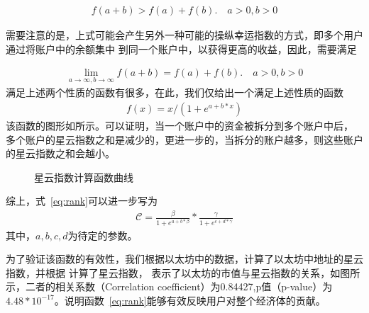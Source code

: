 \begin{align}
f(a + b) > f(a) + f(b).\quad a>0, b>0
\end{align}

需要注意的是，上式可能会产生另外一种可能的操纵幸运指数的方式，即多个用户通过将账户中的余额集中
到同一个账户中，以获得更高的收益，因此，需要满足

\begin{align}
\lim\limits_{a \to \infty, b\to \infty} f(a+b) = f(a) + f(b).\quad a>0, b>0
\end{align}
满足上述两个性质的函数有很多，在此，我们仅给出一个满足上述性质的函数
\begin{align}
f(x) = x/(1 + e^{a + b*x})
\end{align}
\noindent 该函数的图形如所示。可以证明，当一个账户中的资金被拆分到多个账户中后，
多个账户的星云指数之和是减少的，更进一步的，当拆分的账户越多，则这些账户的星云指数之和会越小。

\begin{figure}
\centering
{}
\caption{星云指数计算函数曲线}
\label{fig-nr}
\end{figure}

\vspace{1em}
综上，式~\ref{eq:rank}可以进一步写为
\begin{align}
\mathcal{C} =  \frac{\beta}{1+e^{a + b * \beta}} * \frac{\gamma}{1+e^{c + d * \gamma}}
\end{align}
\noindent 其中，$a, b, c, d$为待定的参数。

为了验证该函数的有效性，我们根据以太坊中的数据，计算了以太坊中地址的星云指数，并根据{\color{red} 计算了星云指数}，
表示了以太坊的市值与星云指数的关系，如图所示，二者的相关系数（Correlation coefficient）为0.84427,p值（p-value）为$4.48*10^{-17}$。说明函数~\ref{eq:rank}能够有效反映用户对整个经济体的贡献。


